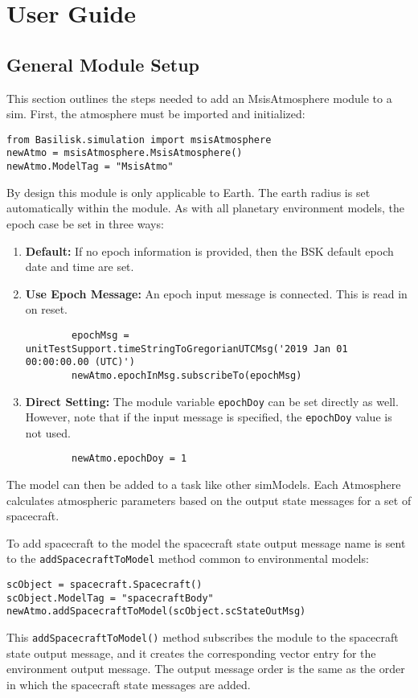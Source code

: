 
\section{User Guide}

\subsection{General Module Setup}
This section outlines the steps needed to add an MsisAtmosphere module to a sim.
First, the atmosphere must be imported and initialized:
\begin{verbatim}
from Basilisk.simulation import msisAtmosphere
newAtmo = msisAtmosphere.MsisAtmosphere()
newAtmo.ModelTag = "MsisAtmo"
\end{verbatim}

By design this module is only applicable to Earth.  The earth radius is set automatically within the module.  As with all planetary environment models, the epoch case be set in three ways:
\begin{enumerate}
	\item  {\bfseries Default:} If no epoch information is provided, then the BSK default epoch date and time are set.
	\item  {\bfseries Use Epoch Message:}  An epoch input message  is connected.  This is read in on reset.
	\begin{verbatim}
		epochMsg = unitTestSupport.timeStringToGregorianUTCMsg('2019 Jan 01 00:00:00.00 (UTC)')
		newAtmo.epochInMsg.subscribeTo(epochMsg)
	\end{verbatim}
	\item  {\bfseries Direct Setting:} The module variable {\tt epochDoy} can be set directly as well.  However, note that if the input message is specified, the {\tt epochDoy} value is not used.
	\begin{verbatim}
		newAtmo.epochDoy = 1
	\end{verbatim}	
\end{enumerate}

The model can then be added to a task like other simModels. Each Atmosphere calculates atmospheric parameters based on the output state messages for a set of spacecraft.

To add spacecraft to the model the spacecraft state output message name is sent to the \verb|addSpacecraftToModel| method common to environmental models:
\begin{verbatim}
scObject = spacecraft.Spacecraft()
scObject.ModelTag = "spacecraftBody"
newAtmo.addSpacecraftToModel(scObject.scStateOutMsg)
\end{verbatim}
This {\tt addSpacecraftToModel()} method subscribes the module to the spacecraft state output message, and it creates the  corresponding vector entry for the environment output message.  The output message order is the same as the order in which the spacecraft state messages are added.

